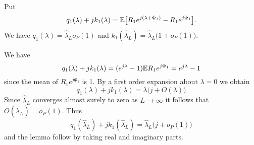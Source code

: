 \documentclass[journal]{IEEEtran}
\begin{document}
\begin{IEEEproof}
\end{IEEEproof}

\begin{lemma}\label{lem:q1k1parts}
Put
\[
q_1(\lambda) + j k_1(\lambda) = {\mathbb E}\big[ R_1 e^{j(\lambda + \Phi_1)} - R_1 e^{j\Phi_1}  \big].
\]
We have $q_1(\lambda) = \hat{\lambda}_L o_P(1)$ and $k_1(\hat{\lambda}_L) = \hat{\lambda}_L\big(1 + o_P(1) \big)$.
\end{lemma}
\begin{IEEEproof}
We have
\[
q_1(\lambda) + j k_1(\lambda) = (e^{j\lambda} - 1) {\mathbb E} R_1e^{j\Phi_1} = e^{j\lambda} - 1
\]
since the mean of $R_1e^{j\Phi_1}$ is 1.  By a first order expansion about $\lambda = 0$ we obtain
\[
q_1(\lambda) + j k_1(\lambda) = \lambda\big( j + O(\lambda) \big)
\]
Since $\hat{\lambda}_L$ converges almost surely to zero as $L\rightarrow\infty$ it follows that $O(\hat{\lambda}_L) = o_P(1)$.  Thus
\[
q_1(\hat{\lambda}_L) + j k_1(\hat{\lambda}_L) = \hat{\lambda}_L\big( j + o_P(1) \big)
\]
and the lemma follow by taking real and imaginary parts.
\end{IEEEproof}
\end{document}
